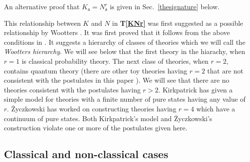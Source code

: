 \documentclass[10pt]{article}
\begin{document}
An alternative proof that $K_\mathsf{a}=N_\mathsf{a}^r$ is given in Sec.\ \ref{thesignature} below.

This relationship between $K$ and $N$ in {\bf T\ref{KNr}} was first suggested as a possible relationship by Wootters \cite{wootters1990local, wootters1986quantum}. It was first proved that it follows from the above conditions in \cite{hardy2001quantum}.  It suggests a hierarchy of classes of theories which we will call the \emph{Wootters hierarchy}.  We will see below that the first theory in the hiarachy, when $r=1$ is classical probability theory.  The next class of theories, when $r=2$, contains quantum theory (there are other toy theories having $r=2$ that are not consistent with the postulates in this paper \cite{kirkpatrick2003hardy, spekkens2007evidence}). We will see that there are no theories consistent with the postulates having $r>2$.  Kirkpatrick \cite{kirkpatrick2003hardy} has given a simple model for theories with a finite number of pure states having any value of $r$.  {\.Z}yczkowski \cite{karol2008quartic} has worked on constructing theories having $r=4$ which have a continuum of pure states.    Both Kirkpatrick's model and {\.Z}yczkowski's construction violate one or more of the postulates given here.

\subsection{Classical and non-classical cases}
\end{document}
